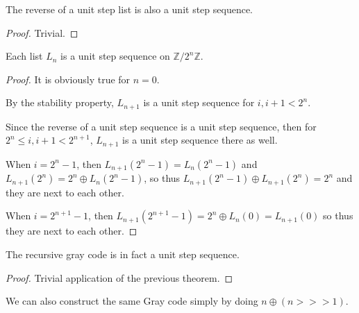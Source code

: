 \begin{lemma}
    \label{thm:reverse_unit_step}
    The reverse of a unit step list is also a unit step sequence.
    \leanok
\end{lemma}

\begin{proof}
    \leanok
    Trivial.
\end{proof}

\begin{theorem}
    \label{thm:list_gray_code_unit_step}

    Each list $L_n$ is a unit step sequence on $\mathbb{Z} / 2^n \mathbb{Z}$.
\end{theorem}

\begin{proof}
    It is obviously true for $n = 0$.

    By the stability property, $L_{n+1}$ is a unit step sequence for $i, i+1 < 2^n$.

    Since the reverse of a unit step sequence is a unit step sequence, then for
    $2^n \le i, i+1 < 2^{n+1}$, $L_{n+1}$ is a unit step sequence there as well.

    When $i = 2^n - 1$, then $L_{n+1}(2^n - 1) = L_{n}(2^n - 1)$ and $L_{n+1}(2^n) = 2^n \oplus L_{n}(2^n - 1)$,
    so thus $L_{n+1}(2^n - 1) \oplus L_{n+1}(2^n) = 2^n$ and they are next to each other.

    When $i = 2^{n+1} - 1$, then $L_{n+1}(2^{n+1} - 1) = 2^n \oplus L_{n}(0) = L_{n+1}(0)$ so thus they are next to each other.
\end{proof}

\begin{theorem}
    \label{thm:recursive_gray_code_unit_step}


    The recursive gray code is in fact a unit step sequence.
\end{theorem}

\begin{proof}
    Trivial application of the previous theorem.
\end{proof}

\begin{definition}
    \label{def:direct_gray_code}
    We can also construct the same Gray code simply by doing $n \oplus (n >>> 1)$.
\end{definition}

